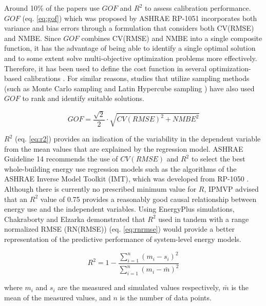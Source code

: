 \documentclass[review]{elsarticle}
\begin{document}
Around 10\% of the papers use $GOF$ and $R^2$ to assess calibration performance. $GOF$ (eq. \ref{eq:gof}) which was proposed by ASHRAE RP-1051 \cite{reddy2007calibrating} incorporates both variance and bias errors through a formulation that considers both CV(RMSE) and NMBE. Since $GOF$ combines CV(RMSE) and NMBE into a single composite function, it has the advantage of being able to identify a single optimal solution and to some extent solve multi-objective optimization problems more effectively. Therefore, it has been used to define the cost function in several optimization-based calibrations \cite{nagpal2019framework, figueiredo2018comparison, ramosruiz2016genetic, ramosruiz2017analysis, nagpal2019framework, larochellemartin2019energy}. For similar reasons, studies that utilize sampling methods (such as Monte Carlo sampling \cite{chen2020automatic} and Latin Hypercube sampling \cite{harmer2015using, cipriano2015evaluation, sakiyama2020natural}) have also used $GOF$ to rank and identify suitable solutions. 

\begin{equation}\label{eq:gof}
GOF = \frac{\sqrt{2}}{2} \cdot \sqrt{CV(RMSE)^2 + NMBE^2}
\end{equation}

$R^2$ (eq. \ref{eq:r2}) provides an indication of the variability in the dependent variable from the mean values that are explained by the regression model. ASHRAE Guideline 14 \cite{ashrae2014guideline} recommends the use of $CV(RMSE)$ and $R^2$ to select the best whole-building energy use regression models such as the algorithms of the ASHRAE Inverse Model Toolkit (IMT), which was developed from RP-1050 \cite{kissock2003inverse, haberl2003inverse}. Although there is currently no prescribed minimum value for $R$, IPMVP \cite{evo2019uncertainty} advised that an $R^2$ value of 0.75 provides a reasonably good causal relationship between energy use and the independent variables. Using EnergyPlus simulations, Chakraborty and Elzarka \cite{chakraborty2017performance} demonstrated that $R^2$ used in tandem with a range normalized RMSE (RN(RMSE)) (eq. \ref{eq:rnrmse}) would provide a better representation of the predictive performance of system-level energy models. 

\begin{equation}\label{eq:r2}
R^2 = 1 - \frac{\sum_{i=1}^n (m_i - s_i)^2}{\sum_{i=1}^n (m_i - \bar{m})^2}
\end{equation}

\noindent where $m_i$ and $s_i$ are the measured and simulated values respectively, $\bar{m}$ is the mean of the measured values, and $n$ is the number of data points.
\end{document}
